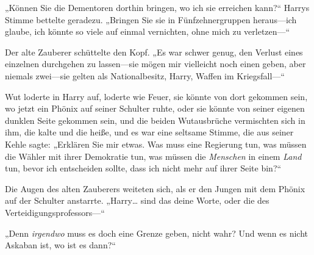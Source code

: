 „Können Sie die Dementoren dorthin bringen, wo ich sie erreichen kann?“ Harrys Stimme bettelte geradezu. „Bringen Sie sie in Fünfzehnergruppen heraus—ich glaube, ich könnte so viele auf einmal vernichten, ohne mich zu verletzen—“

Der alte Zauberer schüttelte den Kopf. „Es war schwer genug, den Verlust eines einzelnen durchgehen zu lassen—sie mögen mir vielleicht noch einen geben, aber niemals zwei—sie gelten als Nationalbesitz, Harry, Waffen im Kriegsfall—“

Wut loderte in Harry auf, loderte wie Feuer, sie könnte von dort gekommen sein, wo jetzt ein Phönix auf seiner Schulter ruhte, oder sie könnte von seiner eigenen dunklen Seite gekommen sein, und die beiden Wutausbrüche vermischten sich in ihm, die kalte und die heiße, und es war eine seltsame Stimme, die aus seiner Kehle sagte: „Erklären Sie mir etwas. Was muss eine Regierung tun, was müssen die Wähler mit ihrer Demokratie tun, was müssen die \emph{Menschen} in einem \emph{Land} tun, bevor ich entscheiden sollte, dass ich nicht mehr auf ihrer Seite bin?“

Die Augen des alten Zauberers weiteten sich, als er den Jungen mit dem Phönix auf der Schulter anstarrte. „Harry… sind das deine Worte, oder die des Verteidigungsprofessors—“

„Denn \emph{irgendwo} muss es doch eine Grenze geben, nicht wahr? Und wenn es nicht Askaban ist, wo ist es dann?“

